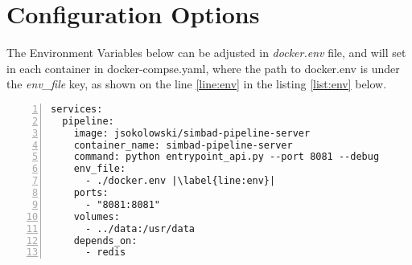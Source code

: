 \chapter*{Configuration Options}\mbox{}
The Environment Variables below can be adjusted in \textit{docker.env} file, and will set in each container in docker-compse.yaml, where the path to docker.env is under the \textit{env\_file} key, as shown on the line \ref{line:env} in the listing \ref{list:env} below.
\begin{lstlisting}[label=list:env,caption=Example of passing \textit{docker.env} file to the container, basicstyle=\footnotesize\ttfamily, escapechar=|, numbers=left]
services:
  pipeline:
    image: jsokolowski/simbad-pipeline-server
    container_name: simbad-pipeline-server
    command: python entrypoint_api.py --port 8081 --debug
    env_file:
      - ./docker.env |\label{line:env}|
    ports:
      - "8081:8081"
    volumes:
      - ../data:/usr/data
    depends_on:
      - redis
\end{lstlisting}
\label{sec:conf-opts}
